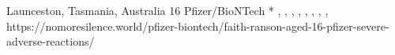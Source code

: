           {
            Launceston, Tasmania, Australia
          }
          {
            16
          }
          {
            Pfizer/BioNTech
          }
          {
            *
          }
          {
            ,
            ,
            ,
            ,
            ,
            ,
            ,
            ,
          }
          {
            https://nomoresilence.world/pfizer-biontech/faith-ranson-aged-16-pfizer-severe-adverse-reactions/
          }

